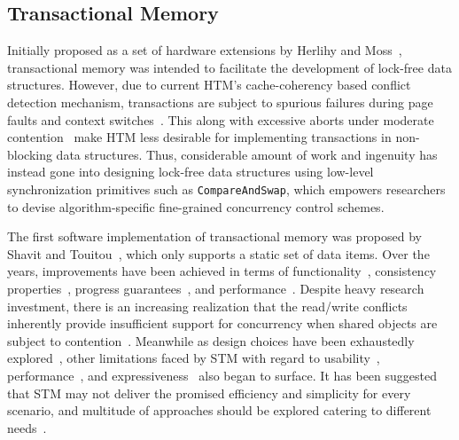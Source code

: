 \documentclass[10pt,conference,compsocconf]{IEEEtran}
\begin{document}
\subsection{Transactional Memory}
Initially proposed as a set of hardware extensions by Herlihy and Moss~\cite{herlihy1993transactional}, transactional memory was intended to facilitate the development of lock-free data structures.
However, due to current HTM's cache-coherency based conflict detection mechanism, transactions are subject to spurious failures during page faults and context switches~\cite{dice2009early}.
This along with excessive aborts under moderate contention~\cite{christina2015resource} make HTM less desirable for implementing transactions in non-blocking data structures.
Thus, considerable amount of work and ingenuity has instead gone into designing lock-free data structures using low-level synchronization primitives such as \texttt{CompareAndSwap}, which empowers researchers to devise algorithm-specific fine-grained concurrency control schemes.

The first software implementation of transactional memory was proposed by Shavit and Touitou~\cite{shavit1997software}, which only supports a static set of data items.
Over the years, improvements have been achieved in terms of functionality~\cite{herlihy2003software}, consistency properties~\cite{guerraoui2008correctness}, progress guarantees~\cite{marathe2006lowering}, and performance~\cite{saha2006mcrt,dice2006transactional}. 
Despite heavy research investment, there is an increasing realization that the read/write conflicts inherently provide insufficient support for concurrency when shared objects are subject to contention~\cite{koskinen2010coarse}.
Meanwhile as design choices have been exhaustedly explored~\cite{marathe2004qualitative,marathe2004design}, other limitations faced by STM with regard to usability~\cite{Rossbach2010transactional}, performance~\cite{cascaval2008software}, and expressiveness~\cite{guerraoui2008obstruction} also began to surface.
It has been suggested that STM may not deliver the promised efficiency and simplicity for every scenario, and multitude of approaches should be explored catering to different needs~\cite{attiya2010inherent}.
\end{document}
